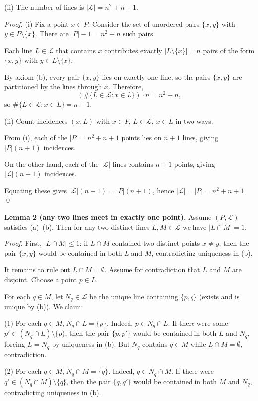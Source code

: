 (ii) The number of lines is $|\mathcal L|=n^2+n+1$.

\emph{Proof.}
(i) Fix a point $x\in P$. Consider the set of unordered pairs $\{x,y\}$ with $y\in P\setminus\{x\}$. There are $|P|-1 = n^2+n$ such pairs.

Each line $L\in\mathcal L$ that contains $x$ contributes exactly $|L\setminus\{x\}|=n$ pairs of the form $\{x,y\}$ with $y\in L\setminus\{x\}$.

By axiom (b), every pair $\{x,y\}$ lies on exactly one line, so the pairs $\{x,y\}$ are partitioned by the lines through $x$. Therefore,
\[
(\#\{L\in\mathcal L: x\in L\})\cdot n = n^2+n,
\]
so $\#\{L\in\mathcal L: x\in L\}=n+1$.

(ii) Count incidences $(x,L)$ with $x\in P$, $L\in\mathcal L$, $x\in L$ in two ways.

From (i), each of the $|P|=n^2+n+1$ points lies on $n+1$ lines, giving $|P|(n+1)$ incidences.

On the other hand, each of the $|\mathcal L|$ lines contains $n+1$ points, giving $|\mathcal L|(n+1)$ incidences.

Equating these gives $|\mathcal L|(n+1)=|P|(n+1)$, hence $|\mathcal L|=|P|=n^2+n+1$.
\qed

\medskip

\textbf{Lemma 2 (any two lines meet in exactly one point).}
Assume $(P,\mathcal L)$ satisfies (a)--(b). Then for any two distinct lines $L,M\in\mathcal L$ we have $|L\cap M|=1$.

\emph{Proof.}
First, $|L\cap M|\le 1$: if $L\cap M$ contained two distinct points $x\ne y$, then the pair $\{x,y\}$ would be contained in both $L$ and $M$, contradicting uniqueness in (b).

It remains to rule out $L\cap M=\emptyset$.
Assume for contradiction that $L$ and $M$ are disjoint. Choose a point $p\in L$.

For each $q\in M$, let $N_q\in\mathcal L$ be the unique line containing $\{p,q\}$ (exists and is unique by (b)).
We claim:

(1) For each $q\in M$, $N_q\cap L = \{p\}$.
Indeed, $p\in N_q\cap L$. If there were some $p'\in (N_q\cap L)\setminus\{p\}$, then the pair $\{p,p'\}$ would be contained in both $L$ and $N_q$, forcing $L=N_q$ by uniqueness in (b). But $N_q$ contains $q\in M$ while $L\cap M=\emptyset$, contradiction.

(2) For each $q\in M$, $N_q\cap M = \{q\}$.
Indeed, $q\in N_q\cap M$. If there were $q'\in (N_q\cap M)\setminus\{q\}$, then the pair $\{q,q'\}$ would be contained in both $M$ and $N_q$, contradicting uniqueness in (b).

